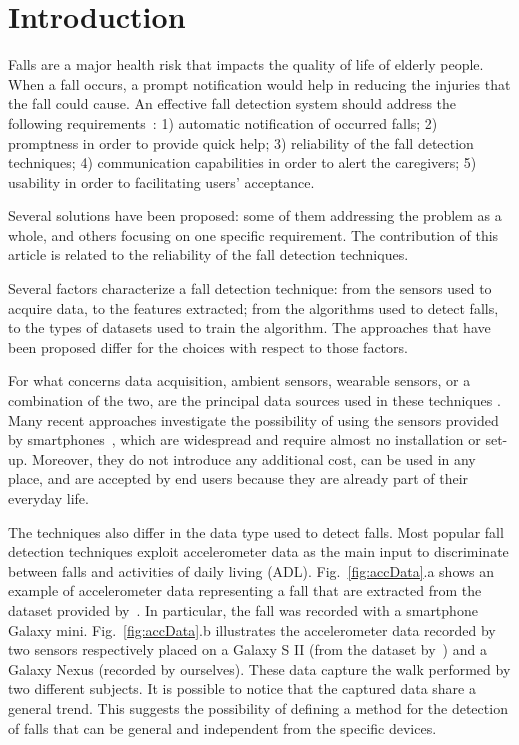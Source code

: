 \documentclass[twocolumn]{svjour3}          \smartqed  \usepackage[draft]{hyperref}
\begin{document}
\section{Introduction}
\label{intro}

Falls are a major health risk that impacts the quality of life of elderly people. When a fall occurs, a prompt notification would help in reducing the injuries that the fall could cause. 
An effective fall detection system should address the following requirements~\citep{abbate2012}: 1) automatic notification of occurred falls; 2) promptness in order to provide quick help; 3) reliability of the fall detection techniques; 4) communication capabilities in order to alert the caregivers; 5) usability in order to facilitating users' acceptance.

Several solutions have been proposed: some of them addressing the problem as a whole, and others focusing on one specific requirement. 
The contribution of this article is related to the reliability of the fall detection techniques.

Several factors characterize a fall detection technique: from the sensors used to acquire data, to the features extracted; from the algorithms used to detect falls, to the types of datasets used to train the algorithm. The approaches that have been proposed differ for the choices with respect to those factors.

For what concerns data acquisition, ambient sensors, wearable sensors, or a combination of the two, are the principal data sources used in these techniques \citep{mubashir_survey_2013,liming_chen_sensor-based_2012}. Many recent approaches investigate the possibility of using the sensors provided by smartphones~\citep{medrano2014,sposaro_ifall:_2009,abbate2012}, which are widespread and require almost no installation or set-up. Moreover, they do not introduce any additional cost, can be used in any place, and are accepted by end users because they are already part of their everyday life.

The techniques also differ in the data type used to detect falls. Most popular fall detection techniques exploit accelerometer data as the main input to discriminate between falls and activities of daily living (ADL). Fig.~\ref{fig:accData}.a shows an example of accelerometer data representing a fall that are extracted from the dataset provided by~\citet{medrano2014}. In particular, the fall was recorded with a smartphone Galaxy mini. Fig.~\ref{fig:accData}.b illustrates the accelerometer data recorded by two sensors respectively placed on a Galaxy S II (from the dataset by~\citet{anguita2013public}) and a Galaxy Nexus (recorded by ourselves). These data capture the walk performed by two different subjects. It is possible to notice that the captured data share a general trend. This suggests the possibility of defining a method for the detection of falls that can be general and independent from the specific devices.
\end{document}
